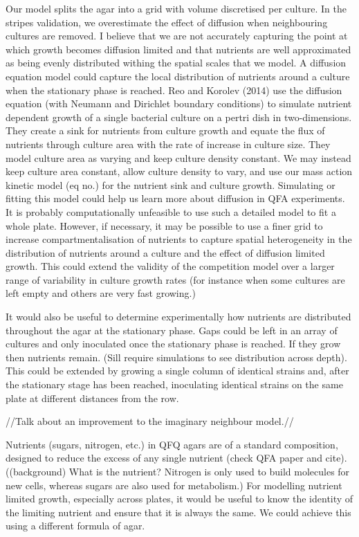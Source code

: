 Our model splits the agar into a grid with volume discretised per
culture. In the stripes validation, we overestimate the effect of
diffusion when neighbouring cultures are removed. I believe that we
are not accurately capturing the point at which growth becomes
diffusion limited and that nutrients are well approximated as being
evenly distributed withing the spatial scales that we model. A
diffusion equation model could capture the local distribution of
nutrients around a culture when the stationary phase is reached.  Reo
and Korolev (2014) use the diffusion equation (with Neumann and
Dirichlet boundary conditions) to simulate nutrient dependent growth
of a single bacterial culture on a pertri dish in two-dimensions. They
create a sink for nutrients from culture growth and equate the flux of
nutrients through culture area with the rate of increase in
culture size. They model culture area as varying and keep culture
density constant. We may instead keep culture area constant, allow
culture density to vary, and use our mass action kinetic model (eq
no.) for the nutrient sink and culture growth. Simulating or fitting
this model could help us learn more about diffusion in QFA
experiments.  It is probably computationally unfeasible to use such a
detailed model to fit a whole plate. However, if necessary, it may be
possible to use a finer grid to increase compartmentalisation of
nutrients to capture spatial heterogeneity in the distribution of
nutrients around a culture and the effect of diffusion limited
growth. This could extend the validity of the competition model over a
larger range of variability in culture growth rates (for instance when
some cultures are left empty and others are very fast growing.)

It would also be useful to determine experimentally how nutrients are
distributed throughout the agar at the stationary phase. Gaps could be
left in an array of cultures and only inoculated once the stationary
phase is reached. If they grow then nutrients remain. (Sill require
simulations to see distribution across depth). This could be extended
by growing a single column of identical strains and, after the
stationary stage has been reached, inoculating identical strains on
the same plate at different distances from the row.

//Talk about an improvement to the imaginary neighbour model.//

Nutrients (sugars, nitrogen, etc.) in QFQ agars are of a standard
composition, designed to reduce the excess of any single nutrient
(check QFA paper and cite). ((background) What is the nutrient?
Nitrogen is only used to build molecules for new cells, whereas sugars
are also used for metabolism.) For modelling nutrient limited growth,
especially across plates, it would be useful to know the identity of
the limiting nutrient and ensure that it is always the same. We could
achieve this using a different formula of agar.

